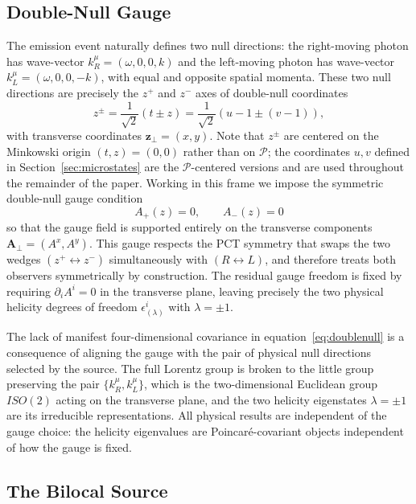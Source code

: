 \documentclass[12pt,a4paper]{article}
\begin{document}
\subsection{Double-Null Gauge}
\label{sec:doublenull}
The emission event naturally defines two null directions: the 
right-moving photon has wave-vector 
$k^\mu_R = (\omega, 0, 0, k)$ and the left-moving photon has 
wave-vector $k^\mu_L = (\omega, 0, 0, -k)$, with equal and 
opposite spatial momenta. These two null directions are 
precisely the $z^+$ and $z^-$ axes of double-null coordinates
\begin{equation}
  z^\pm = \frac{1}{\sqrt{2}}(t \pm z) 
  = \frac{1}{\sqrt{2}}(u - 1 \pm (v - 1)),
\end{equation}
with transverse coordinates $\mathbf{z}_\perp = (x, y)$. 
Note that $z^\pm$ are centered on the Minkowski origin 
$(t,z) = (0,0)$ rather than on $\mathcal{P}$; the 
coordinates $u, v$ defined in 
Section~\ref{sec:microstates} are the $\mathcal{P}$-centered 
versions and are used throughout the remainder of the paper.
Working in this frame we impose the symmetric double-null 
gauge condition
\begin{equation}
    A_+(z) = 0, \qquad A_-(z) = 0
\label{eq:doublenull}
\end{equation}
so that the gauge field is supported entirely on the 
transverse components $\mathbf{A}_\perp = (A^x, A^y)$. This 
gauge respects the PCT symmetry that swaps the two wedges 
$(z^+ \leftrightarrow z^-)$ simultaneously with 
$(R \leftrightarrow L)$, and therefore treats both observers 
symmetrically by construction. The residual gauge freedom is 
fixed by requiring $\partial_i A^i = 0$ in the transverse 
plane, leaving precisely the two physical helicity degrees of 
freedom $\epsilon^i_{(\lambda)}$ with $\lambda = \pm 1$. 

The lack of manifest four-dimensional covariance in 
equation~\eqref{eq:doublenull} is a consequence of aligning 
the gauge with the pair of physical null directions selected 
by the source. The full Lorentz group is broken to the little 
group preserving the pair $\{k^\mu_R, k^\mu_L\}$, which is 
the two-dimensional Euclidean group $ISO(2)$ acting on the 
transverse plane, and the two helicity eigenstates 
$\lambda = \pm 1$ are its irreducible representations. 
All physical results are independent of the gauge choice: 
the helicity eigenvalues are Poincar\'{e}-covariant objects 
independent of how the gauge is fixed.

\subsection{The Bilocal Source}
\label{sec:bilocal_source}
\end{document}
